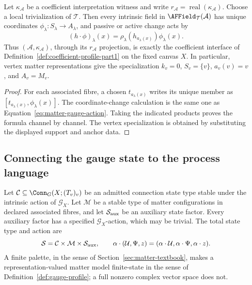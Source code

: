 \begin{proposition}
\label{prop:coefficient-compatibility}
Let $\kappa_{\mathcal A}$ be a coefficient interpretation witness and write
$r_{\mathcal A}=\operatorname{real}(\kappa_{\mathcal A})$.  Choose a local
trivialization of $\mathcal T$.  Then every intrinsic field in
$\AFField_{\mathcal T}(\mathcal A)$ has unique coordinates
$\phi_\lambda:S_\lambda\to A_\lambda$, and passive or active change acts by
\[
 (h\cdot\phi)_\lambda(x)
 =\rho_\lambda(h_{a_\lambda(x)})\phi_\lambda(x).
\]
Thus $(\mathcal A,\kappa_{\mathcal A})$, through its $r_{\mathcal A}$
projection, is exactly the coefficient interface of
Definition~\ref{def:coefficient-profile-part1} on the fixed canvas $X$.  In
particular, vertex
matter representations give the specialization
$k_v=0$, $S_v=\{v\}$, $a_v(v)=v$, and $A_v=M_v$.
\end{proposition}

\begin{proof}
For each associated fibre, a chosen $t_{a_\lambda(x)}$ writes its unique member
as $[t_{a_\lambda(x)},\phi_\lambda(x)]$.  The coordinate-change calculation is
the same one as Equation~\eqref{eq:matter-gauge-action}.  Taking the indicated
products proves the formula channel by channel.  The vertex specialization is
obtained by substituting the displayed support and anchor data.
\end{proof}

\subsection{Connecting the gauge state to the process language}

Let $\mathcal C\subseteq\Conn_G(X;(T_v)_v)$ be an admitted connection state
type stable under the intrinsic action of $\mathscr G_X$.  Let $\mathcal M$ be
a stable type of matter configurations in declared associated fibres, and let
$\mathcal S_{\rm aux}$ be an auxiliary state factor.  Every auxiliary
factor has a specified $\mathscr G_X$-action, which may be trivial.  The total
state type and action are
\begin{equation}
\mathcal S
 =\mathcal C\times\mathcal M\times\mathcal S_{\rm aux},
 \qquad
 \alpha\cdot(\mathcal U,\Psi,z)
 =(\alpha\cdot\mathcal U,\alpha\cdot\Psi,\alpha\cdot z).
 \label{eq:total-gauge-state}
\end{equation}
A finite palette, in the sense of Section~\ref{sec:matter-textbook}, makes a
representation-valued matter model finite-state in the sense of
Definition~\ref{def:gauge-profile}; a full nonzero complex vector space does
not.

